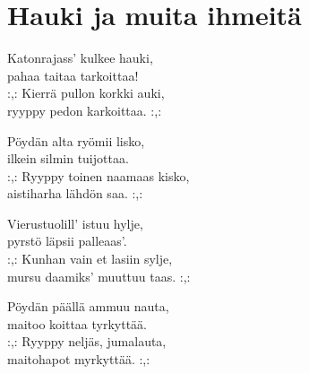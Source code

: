 \section{Hauki ja muita ihmeitä}

Katonrajass’ kulkee hauki,\\
pahaa taitaa tarkoittaa!\\
:,: Kierrä pullon korkki auki,\\
ryyppy pedon karkoittaa. :,:

Pöydän alta ryömii lisko,\\
ilkein silmin tuijottaa.\\
:,: Ryyppy toinen naamaas kisko,\\
aistiharha lähdön saa. :,:

Vierustuolill’ istuu hylje,\\
pyrstö läpsii palleaas’.\\
:,: Kunhan vain et lasiin sylje,\\
mursu daamiks’ muuttuu taas. :,:

Pöydän päällä ammuu nauta,\\
maitoo koittaa tyrkyttää.\\
:,: Ryyppy neljäs, jumalauta,\\
maitohapot myrkyttää. :,: